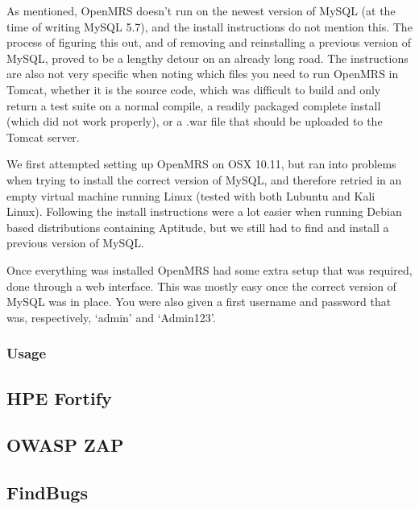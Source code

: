 \documentclass{article}
\begin{document}
  As mentioned, OpenMRS doesn't run on the newest version of MySQL (at the time
  of writing MySQL 5.7), and the install instructions do not mention this. The
  process of figuring this out, and of removing and reinstalling a previous
  version of MySQL, proved to be a lengthy detour on an already long road.
  The instructions are also not very specific when noting which files you need
  to run OpenMRS in Tomcat, whether it is the source code, which was difficult
  to build and only return a test suite on a normal compile, a readily packaged
  complete install (which did not work properly), or a .war file that should be
  uploaded to the Tomcat server.


  We first attempted setting up OpenMRS on OSX 10.11, but ran into problems when
  trying to install the correct version of MySQL, and therefore retried in an
  empty virtual machine running Linux (tested with both Lubuntu and Kali Linux).
  Following the install instructions were a lot easier when running Debian based
  distributions containing Aptitude, but we still had to find and install a
  previous version of MySQL. 


  Once everything was installed OpenMRS had some extra setup that was required,
  done through a web interface. This was mostly easy once the correct version of
  MySQL was in place. You were also given a first username and password that
  was, respectively, `admin' and `Admin123'.

\subsubsection{Usage}

\subsection{HPE Fortify}
\subsection{OWASP ZAP}
\subsection{FindBugs}
\end{document}
